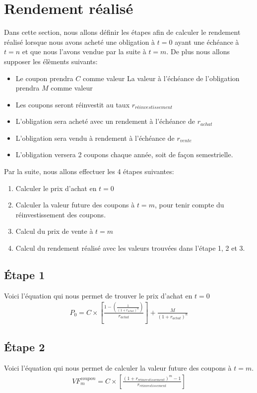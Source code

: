 \documentclass[12pt]{article}
\begin{document}
\newpage

\section{Rendement réalisé}
Dans cette section, nous allons définir les étapes afin de calculer le rendement réalisé lorsque nous avons acheté une obligation à $t=0$ ayant une échéance à $t=n$ et que nous l'avons vendue par la suite à $t=m$. De plus nous allons supposer les élèments suivants:
\begin{itemize}
\item Le coupon prendra $C$ comme valeur 
\iten La valeur à l'échéance de l'obligation prendra $M$ comme valeur
\item Les coupons seront réinvestit au taux $r_{réinvestissement}$ 
\item L'obligation sera acheté avec un rendement à l'échéance de $r_{achat}$
\item L'obligation sera vendu à rendement à l'échéance de $r_{vente}$
\item L'obligation versera 2 coupons chaque année, soit de façon semestrielle. 
\end{itemize}

 
Par la suite, nous allons effectuer les 4 étapes suivantes: 
\begin{enumerate}
\item Calculer le prix d'achat en $t=0$
\item Calculer la valeur future des coupons à $t=m$, pour tenir compte du réinvestissement des coupons.
\item Calcul du prix de vente à $t=m$
\item Calcul du rendement réalisé avec les valeurs trouvées dans l'étape 1, 2 et 3.
\end{enumerate}

\subsection{Étape 1}
Voici l'équation qui nous permet de trouver le prix d'achat en $t=0$
\begin{align*}
P_0=C \times \left[\frac{1-\left( \frac{1}{(1+r_{achat})^n}\right)}{r_{achat}} \right] +\frac{M}{(1+r_{achat})^n}
\end{align*}
\subsection{Étape 2}
Voici l'équation qui nous permet de calculer la valeur future des coupons à $t=m$.
\begin{align*}
VF_m^{coupon}=C \times \left[ \frac{(1+r_{réinvestissement})^m-1}{r_{réinvestissement}} \right]
\end{align*}
\end{document}
